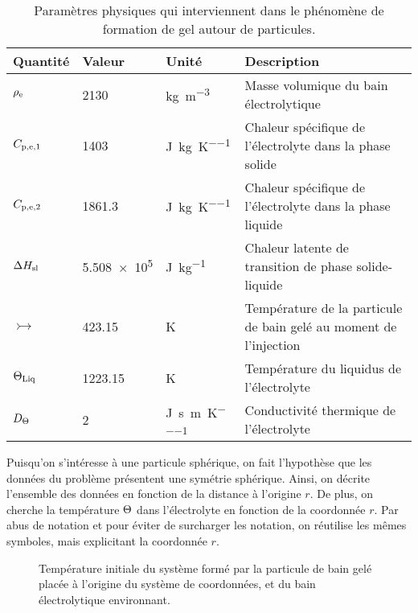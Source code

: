 \begin{table}
  \begin{center}
    \caption{Paramètres physiques qui interviennent dans le
      phénomène de formation de gel autour de particules.}
    \label{tab:freeze-physical-parameters}
    \begin{tabularx}{\textwidth}{@{}lllX@{}}
      \toprule
      Quantité              & Valeur       & Unité                                       & Description \\
      \midrule
      $\rho_\mathrm{e}$ & \num{2130}    & \si{\kg\per\cubic\meter}                    & Masse volumique du bain électrolytique \\
      $C_{\mathrm{p,e,1}}$     & \num{1403}    & \si{\joule\per\kilo\gram\per\kelvin}        & Chaleur spécifique de l'électrolyte dans la phase solide \\
      $C_{\mathrm{p,e,2}}$     & \num{1861.3}  & \si{\joule\per\kilo\gram\per\kelvin}        & Chaleur spécifique de l'électrolyte dans la phase liquide \\
      $\Delta H_\mathrm{sl}$     & \num{5.508e5} & \si{\joule\per\kilo\gram}                   & Chaleur latente de transition de phase solide-liquide \\
      $\tinj$               & \num{423.15}  & \si{\kelvin}                                & Température de la particule de bain gelé au moment de l'injection \\
      $\Theta_\text{Liq}$               & \num{1223.15}  & \si{\kelvin}                                & Température du liquidus de l'électrolyte \\
      $D_\Theta$   & \num{2}     & \si{\joule\per\second\per\meter\per\kelvin} & Conductivité thermique de l'électrolyte \\
      \bottomrule
    \end{tabularx}
\end{center}
\end{table}

Puisqu'on s'intéresse à une particule sphérique, on fait l'hypothèse
que les données du problème présentent une symétrie sphérique. Ainsi,
on décrite l'ensemble des données en fonction de la distance à
l'origine $r$. De plus, on cherche la température $\Theta$ dans
l'électrolyte en fonction de la coordonnée $r$. Par abus de notation
et pour éviter de surcharger les notation, on réutilise les mêmes
symboles, mais explicitant la coordonnée $r$.

\begin{figure}[h]
  \begin{center}
    
    \caption{Température initiale du système formé par la particule de
      bain gelé placée à l'origine du système de coordonnées, et du
      bain électrolytique environnant.}
    \label{fig:particle-initial-temperature}
  \end{center}
\end{figure}

